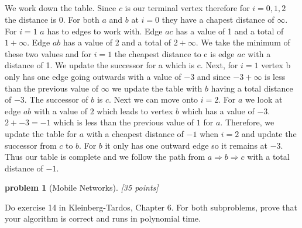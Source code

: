 \documentclass[10pt]{article}
\newtheorem{problem}{\sc\color{cit}problem}
\begin{document}
{\subparagraph{} We work down the table. Since $c$ is our terminal vertex therefore for $i = 0, 1, 2$ the distance is 0. For both $a$ and $b$ at $i = 0$ they have a chapest distance of $\infty$. 
For $i = 1$ $a$ has to edges to work with. Edge $ac$ has a value of 1 and a total of $1 + \infty$. Edge $ab$ has a value of 2 and a total of $2 + \infty$. We take the minimum of these two values and for $i = 1$ the cheapest distance
to c is edge $ac$ with a distance of 1. We update the successor for a which is c. Next, for $i = 1$ vertex b only has one edge going outwards with a value of $-3$ and since $-3 + \infty$ is less than the 
previous value of $\infty$ we update the table with $b$ having a total distance of $-3$. The successor of $b$ is $c$. Next we can move onto $i = 2$. For $a$ we look at edge $ab$ with a value of $2$ which leads to vertex $b$ which has a value of $-3$. 
$2 + -3 = -1$ which is less than the previous value of $1$ for $a$. Therefore, we update the table for $a$ with a cheapest distance of $-1$ when $i = 2$ and update the successor from $c$ to $b$. For $b$ it only has
one outward edge so it remains at $-3$. Thus our table is complete and we follow the path from $a \Rightarrow b \Rightarrow c$ with a total distance of $-1$.   


}

\newpage
\medskip{}

\newpage
\begin{problem}[Mobile Networks][35 points]
\end{problem}
Do exercise 14 in Kleinberg-Tardos, Chapter 6. For both subproblems, prove that your algorithm is correct and runs in polynomial time.
\end{document}

